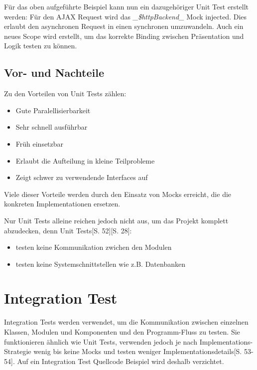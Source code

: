 \documentclass[a4paper,bibtotoc,oneside]{scrbook}
\begin{document}
Für das oben aufgeführte Beispiel kann nun ein dazugehöriger Unit Test erstellt werden: Für den AJAX Request wird das \emph{\_\$httpBackend\_} Mock injected. Dies erlaubt den asynchronen Request in einen synchronen umzuwandeln. Auch ein neues Scope wird erstellt, um das korrekte Binding zwischen Präsentation und Logik testen zu können.



\section{Vor- und Nachteile}

Zu den Vorteilen von Unit Tests zählen:

\begin{itemize}
  \item Gute Paralellisierbarkeit
  \item Sehr schnell ausführbar
  \item Früh einsetzbar
  \item Erlaubt die Aufteilung in kleine Teilprobleme
  \item Zeigt schwer zu verwendende Interfaces auf
\end{itemize}

Viele dieser Vorteile werden durch den Einsatz von Mocks erreicht, die die konkreten Implementationen ersetzen.

Nur Unit Tests alleine reichen jedoch nicht aus, um das Projekt komplett abzudecken, denn Unit Tests\cite{test_large_systems}[S. 52]\cite{betrieb}[S. 28]:

\begin{itemize}
  \item testen keine Kommunikation zwichen den Modulen
  \item testen keine Systemschnittstellen wie z.B. Datenbanken
\end{itemize}

\chapter{Integration Test}
Integration Tests werden verwendet, um die Kommunikation zwischen einzelnen Klassen, Modulen und Komponenten und den Programm-Fluss zu testen. Sie funktionieren ähnlich wie Unit Tests, verwenden jedoch je nach Implementations-Strategie wenig bis keine Mocks und testen weniger Implementationsdetails\cite{test_large_systems}[S. 53-54]. Auf ein Integration Test Quellcode Beispiel wird deshalb verzichtet. 
\end{document}
